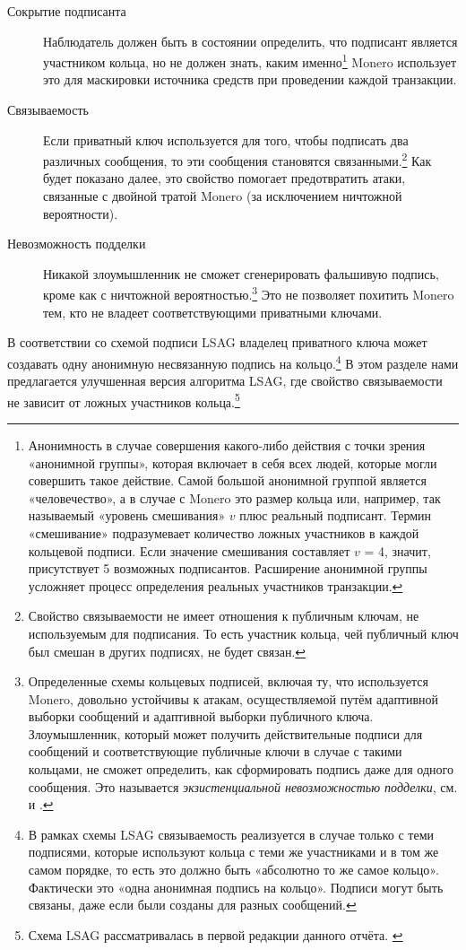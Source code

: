 \begin{description}
	\item[Сокрытие подписанта]
	Наблюдатель должен быть в состоянии определить, что подписант является участником кольца, но не должен знать, каким именно\footnote{\label{anonymity_note}Анонимность в случае совершения какого-либо действия с точки зрения «анонимной группы», которая включает в себя всех людей, которые могли совершить такое действие. Самой большой анонимной группой является «человечество», а в случае с Monero это размер кольца или, например, так называемый «уровень смешивания» $v$ плюс реальный подписант. Термин «смешивание» подразумевает количество ложных участников в каждой кольцевой подписи. Если значение смешивания составляет $v$ = 4, значит, присутствует 5 возможных подписантов. Расширение анонимной группы усложняет процесс определения реальных участников транзакции.} Monero использует это для маскировки источника средств при проведении каждой транзакции.

	\item[Связываемость]
	Если приватный ключ используется для того, чтобы подписать два различ\-ных сообщения, то эти сообщения становятся связанными.\footnote{\label{linkability_note}Свойство связываемости не имеет отношения к публичным ключам, не используемым для подписания. То есть участник кольца, чей публичный ключ был смешан в других подписях, не будет связан.} Как будет показано далее, это свойство помогает предотвратить атаки, связанные с двойной тратой Monero (за исключением ничтожной вероятности).

	\item[Невозможность подделки]
    Никакой злоумышленник не сможет сгенерировать фальшивую подпись, кроме как с ничтожной вероятностью.\footnote{\label{unforgeability_note}Определенные схемы кольцевых подписей, включая ту, что используется Monero, довольно устойчивы к атакам, осуществляемой путём адаптивной выборки сообщений и адаптивной выборки публичного ключа. Злоумышленник, который может получить действительные подписи для сообщений и соответствующие публичные ключи в случае с такими кольцами, не сможет определить, как сформировать подпись даже для одного сообщения. Это называется {\em экзистенциальной невозможностью подделки}, см. \cite{MRL-0005-ringct} и \cite{Liu2004}.} Это не позволяет похитить Monero тем, кто не владеет соответствующими приватными ключами.
\end{description}

В соответствии со схемой подписи LSAG \cite{Liu2004} владелец приватного ключа может создавать одну анонимную несвязанную подпись на кольцо.\footnote{\label{lsag_linkability_note}В рамках схемы LSAG связываемость реализуется в случае только с теми подписями, которые используют кольца с теми же участниками и в том же самом порядке, то есть это должно быть «абсолютно то же самое кольцо». Фактически это «одна анонимная подпись на кольцо». Подписи могут быть связаны, даже если были созданы для разных сообщений.} В этом разделе нами предлагается улуч\-шенная версия алгоритма LSAG, где свойство связываемости не зависит от ложных участни\-ков кольца.\footnote{Схема LSAG рассматривалась в первой редакции данного отчёта. \cite{ztm-1}}

